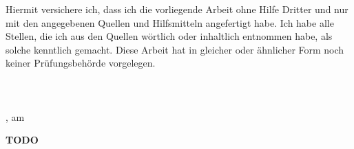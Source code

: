 Hiermit versichere ich, dass ich die vorliegende Arbeit ohne Hilfe Dritter und nur mit den angegebenen Quellen und
Hilfsmitteln angefertigt habe. Ich habe alle Stellen, die ich aus den Quellen wörtlich oder inhaltlich entnommen habe,
als solche kenntlich gemacht. Diese Arbeit hat in gleicher oder ähnlicher Form noch keiner Prüfungsbehörde vorgelegen.\\
\\
\\
\\
\ort, am \datum



	\textbf{TODO}
